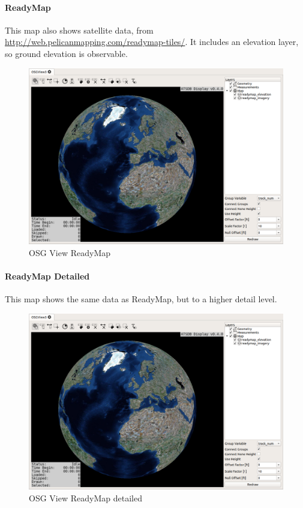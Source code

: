 {\newpage
\paragraph{ReadyMap}

This map also shows satellite data, from \url{http://web.pelicanmapping.com/readymap-tiles/}. It includes an elevation layer, so ground elevation is observable.

\begin{figure}[H]
    \hspace*{-2cm}
    \includegraphics[width=18cm,frame]{../screenshots/osgview_ready.png}
  \caption{OSG View ReadyMap}
\end{figure}


\paragraph{ReadyMap Detailed}

This map shows the same data as ReadyMap, but to a higher detail level.

\begin{figure}[H]
    \hspace*{-2cm}
    \includegraphics[width=18cm,frame]{../screenshots/osgview_ready.png}
  \caption{OSG View ReadyMap detailed}
\end{figure}

}
